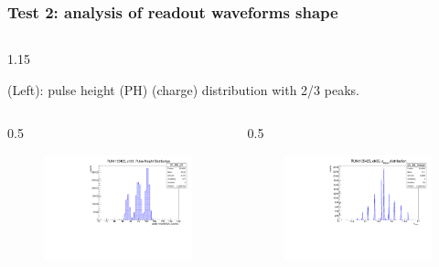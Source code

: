 \documentclass{beamer}
\begin{document}
\begin{frame}
    \frametitle{Test 2: analysis of readout waveforms shape}
    \vspace{-3mm}
    \begin{columns}
\begin{column}{1.15\framewidth}
    \setlength{\leftmargini}{1.2em}
 \begin{itemize}
{\footnotesize \item (Left): pulse height (PH) (charge) distribution with 2/3 peaks.}
  \end{itemize}
    \end{column}
    \end{columns}
        \vspace{-2mm}
    \begin{columns}
\begin{column}{0.5\framewidth}
         \begin{figure}[!h]
      \centering
      \hspace*{-2em}
      \includegraphics[width=0.9\columnwidth]{figures/pdf/pulseheight.pdf}
     \label{fig:normalhits}
\end{figure}
\end{column}
\begin{column}{0.5\framewidth}
      \begin{figure}[!h]
      \centering
            \hspace*{-1em}
\includegraphics[width=0.9\columnwidth]{figures/pdf/tmean1.pdf}

\end{figure}
\end{column}
\end{columns}
\end{frame}
\end{document}
